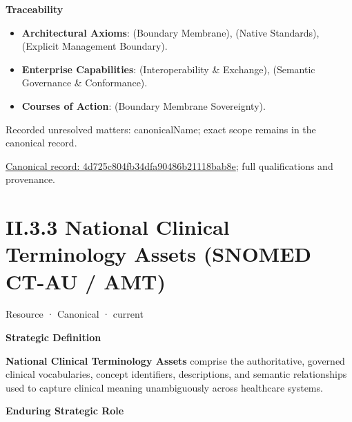 \par\medskip\textbf{Traceability}\par


\begin{itemize}


\item \textbf{Architectural Axioms}: \texttt{} (Boundary Membrane), \texttt{} (Native Standards), \texttt{} (Explicit Management Boundary).

\item \textbf{Enterprise Capabilities}: \texttt{} (Interoperability \& Exchange), \texttt{} (Semantic Governance \& Conformance).

\item \textbf{Courses of Action}: \texttt{} (Boundary Membrane Sovereignty).

\end{itemize}

{\small Recorded unresolved matters: canonicalName; exact scope remains in the canonical record.}\par
{\footnotesize \href{../../../../continuum/strategy/resource/4d725c804fb34dfa90486b21118bab8e.md}{Canonical record: 4d725c804fb34dfa90486b21118bab8e}; full qualifications and provenance.}\par
\section*{II.3.3 National Clinical Terminology Assets (SNOMED CT-AU / AMT)}
\label{navigation:II.3.3}

\label{element:430f641e40aa4bd4a8e85a5cbc1f93be}
{\small Resource · Canonical · current}\par

\par\medskip\textbf{Strategic Definition}\par


\textbf{National Clinical Terminology Assets} comprise the authoritative, governed clinical vocabularies, concept identifiers, descriptions, and semantic relationships used to capture clinical meaning unambiguously across healthcare systems.



\par\medskip\textbf{Enduring Strategic Role}\par


